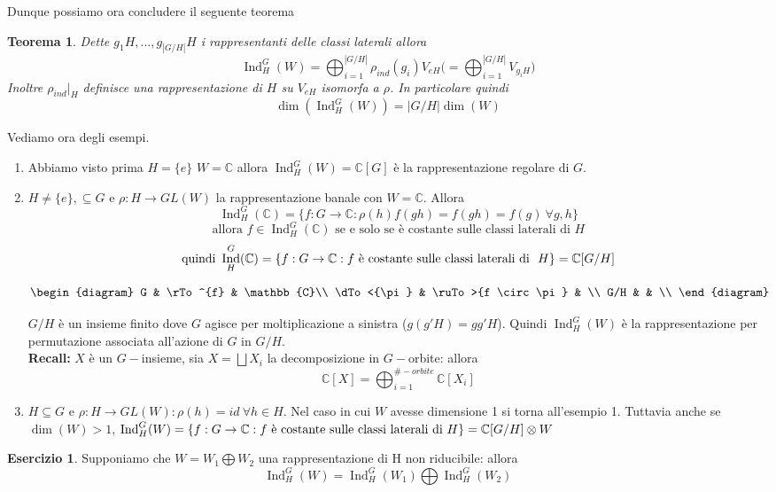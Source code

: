 \documentclass[11pt]{article}
\theoremstyle{plain}
\newtheorem{thm}{Teorema}[section]
\theoremstyle{definition}
\newtheorem{exercise}{Esercizio}[section]
\theoremstyle{remark}
\newcommand{\C}{\mathbb{C}}
\DeclareMathOperator{\Ind}{Ind}
\begin{document}
Dunque possiamo ora concludere il seguente teorema
\begin{thm} Dette $g_1H,...,g_{|G/H|}H$ i rappresentanti delle classi laterali allora 
\[\Ind_H^G(W)=\bigoplus_{i=1}^{|G/H|}\rho_{ind}(g_i)V_{eH}\bigl( =\bigoplus_{i=1}^{|G/H|} V_{g_iH}\bigr) \]
Inoltre $\rho_{ind}|_H$ definisce una rappresentazione di $H$ su $V_{eH}$ isomorfa a $\rho$. In particolare quindi 
\[\dim(\Ind_H^G(W))=|G/H|\dim(W)\] 
\end{thm}
Vediamo ora degli esempi.
\begin{enumerate}
\item Abbiamo visto prima $H=\{e\}$ $W=\C$ allora $\Ind_H^G(W)=\C[G]$ è la rappresentazione regolare di $G$. 
\item $H\neq \{e\},\subseteq G$ e $\rho:H\rightarrow GL(W)$ la rappresentazione banale con $W=\C$. Allora
\[\Ind_H^G(\C)=\{f:G\rightarrow \C:\rho(h)f(gh)=f(gh)=f(g)\ \forall g,h\} \]
\[\text{allora } f \in \Ind_H^G(\C)\text{ se e solo se è costante sulle classi laterali di } H\]
\[\text{quindi } \Ind_H^G(\C)=\{f:G\rightarrow \C:f \textup{ è costante sulle classi laterali di }\ H\}=\C[G/H]\]



\[
\begin{diagram}
G          & \rTo^{f}            & \C \\
\dTo<{\pi} & \ruTo>{f \circ \pi} &    \\
G/H        &                     &    \\
\end{diagram}
\]


$G/H$ è un insieme finito dove $G$ agisce per moltiplicazione a sinistra ($g(g'H)=gg'H$). Quindi $\Ind_H^G(W)$ è la rappresentazione per permutazione associata all'azione di $G$ in $G/H$. \\
\textbf{Recall:} $X$ è un $G-$insieme, sia $X= \bigsqcup X_i$ la decomposizione in $G-$orbite: allora 
\[\C[X]=\bigoplus_{i=1}^{\#-orbite} \C[X_i]\] 
\item $H\subseteq G$ e $\rho:H\rightarrow GL(W): \rho(h)=id\ \forall h\in H$. Nel caso in cui $W$ avesse dimensione 1 si torna all'esempio 1. Tuttavia anche se $\dim(W)>1$, $\Ind_H^G(W)=\{f:G\rightarrow \C:f \textup{ è costante sulle classi laterali di } H\}=\C[G/H]\otimes W$ 
\end{enumerate}
\begin{exercise} Supponiamo che $W=W_1\bigoplus W_2$ una rappresentazione di H non riducibile: allora 
\[\Ind_H^G(W)=\Ind_H^G(W_1)\bigoplus \Ind_H^G(W_2)\]
\end{exercise}
\end{document}
